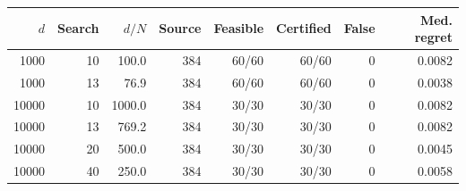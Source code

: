 \begin{tabular}{rrrrrrrr}
\toprule
$d$ & Search & $d/N$ & Source & Feasible & Certified & False & Med. regret \\
\midrule
1000 & 10 & 100.0 & 384 & 60/60 & 60/60 & 0 & 0.0082 \\
1000 & 13 & 76.9 & 384 & 60/60 & 60/60 & 0 & 0.0038 \\
10000 & 10 & 1000.0 & 384 & 30/30 & 30/30 & 0 & 0.0082 \\
10000 & 13 & 769.2 & 384 & 30/30 & 30/30 & 0 & 0.0082 \\
10000 & 20 & 500.0 & 384 & 30/30 & 30/30 & 0 & 0.0045 \\
10000 & 40 & 250.0 & 384 & 30/30 & 30/30 & 0 & 0.0058 \\
\bottomrule
\end{tabular}
